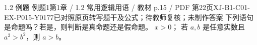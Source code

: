 \par\noindent\begin{minipage}{\linewidth}
\begin{bankitem}{1.2 例题 例题1}{第1章 / 1.2 常用逻辑用语 / 教材 p.15 / PDF 第22页}{XJ-B1-C01-EX-P015-Y0177}{已对照原页转写题干及公式；待教师复核；未制作答案}
下列语句是命题吗？若是，则判断是真命题还是假命题。
$x>0$；
若 $a,b$ 是任意实数且 $a^2>b^2$，则 $a>b$。
\end{bankitem}
\end{minipage}\par\medskip
